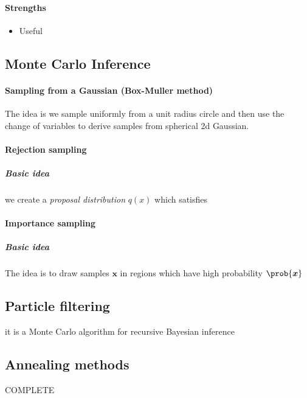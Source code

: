 \paragraph{Strengths}
\begin{itemize}
    \item Useful 
\end{itemize}

\subsection{Monte Carlo Inference}
\paragraph{Sampling from a Gaussian (Box-Muller method)}
The idea is we sample uniformly from a unit radius circle and then use the change of variables to
derive samples from spherical 2d Gaussian.

\paragraph{Rejection sampling}
\subparagraph{Basic idea}
we create a \emph{proposal distribution} $q(x)$ which satisfies 

\paragraph{Importance sampling}
\subparagraph{Basic idea}
The idea is to draw samples $\bm{x}$ in regions which have high probability $\prob{\bm{x}}$

\subsection{Particle filtering}
it is a Monte Carlo algorithm for recursive Bayesian inference

\subsection{Annealing methods}
COMPLETE


